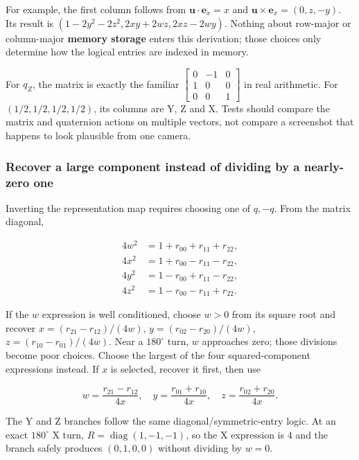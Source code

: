 For example, the first column follows from \(\mathbf u\cdot\mathbf e_x=x\) and \(\mathbf u\times\mathbf e_x=(0,z,-y)\). Its result is \((1-2y^2-2z^2,2xy+2wz,2xz-2wy)\). Nothing about row-major or column-major \textbf{memory storage} enters this derivation; those choices only determine how the logical entries are indexed in memory.

For \(q_Z\), the matrix is exactly the familiar \(\begin{bmatrix}0&-1&0\\1&0&0\\0&0&1\end{bmatrix}\) in real arithmetic. For \((1/2,1/2,1/2,1/2)\), its columns are Y, Z and X. Tests should compare the matrix and quaternion actions on multiple vectors, not compare a screenshot that happens to look plausible from one camera.

\subsubsection{Recover a large component instead of dividing by a nearly-zero one}\label{recover-a-large-component-instead-of-dividing-by-a-nearly-zero-one}

Inverting the representation map requires choosing one of \(q,-q\). From the matrix diagonal,

\[
\begin{aligned}
4w^2&=1+r_{00}+r_{11}+r_{22},\\
4x^2&=1+r_{00}-r_{11}-r_{22},\\
4y^2&=1-r_{00}+r_{11}-r_{22},\\
4z^2&=1-r_{00}-r_{11}+r_{22}.
\end{aligned}
\]

If the \(w\) expression is well conditioned, choose \(w>0\) from its square root and recover \(x=(r_{21}-r_{12})/(4w)\), \(y=(r_{02}-r_{20})/(4w)\), \(z=(r_{10}-r_{01})/(4w)\). Near a \(180^\circ\) turn, \(w\) approaches zero; those divisions become poor choices. Choose the largest of the four squared-component expressions instead. If \(x\) is selected, recover it first, then use

\[
w=\frac{r_{21}-r_{12}}{4x},\quad
y=\frac{r_{01}+r_{10}}{4x},\quad
z=\frac{r_{02}+r_{20}}{4x}.
\]

The Y and Z branches follow the same diagonal/symmetric-entry logic. At an exact \(180^\circ\) X turn, \(R=\operatorname{diag}(1,-1,-1)\), so the X expression is \(4\) and the branch safely produces \((0,1,0,0)\) without dividing by \(w=0\).

